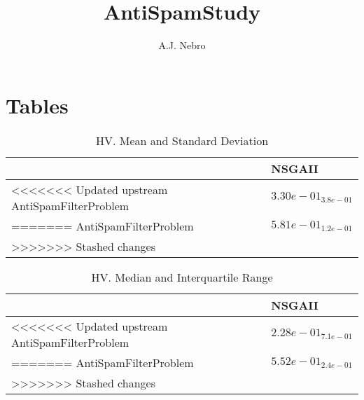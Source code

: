\documentclass{article}
\title{AntiSpamStudy}
\author{A.J. Nebro}
\begin{document}
\maketitle
\section{Tables}

\begin{table}
\caption{HV. Mean and Standard Deviation}
\label{table: HV}
\centering
\begin{scriptsize}
\begin{tabular}{ll}
\hline &  NSGAII\\
\hline 
<<<<<<< Updated upstream
AntiSpamFilterProblem & \cellcolor{gray95}$  3.30e-01_{ 3.8e-01}$ \\
=======
AntiSpamFilterProblem & \cellcolor{gray95}$  5.81e-01_{ 1.2e-01}$ \\
>>>>>>> Stashed changes
\hline
\end{tabular}
\end{scriptsize}
\end{table}

\begin{table}
\caption{HV. Median and Interquartile Range}
\label{table: HV}
\centering
\begin{scriptsize}
\begin{tabular}{ll}
\hline &  NSGAII\\
\hline 
<<<<<<< Updated upstream
AntiSpamFilterProblem & \cellcolor{gray95}$  2.28e-01_{ 7.1e-01}$ \\
=======
AntiSpamFilterProblem & \cellcolor{gray95}$  5.52e-01_{ 2.4e-01}$ \\
>>>>>>> Stashed changes
\hline
\end{tabular}
\end{scriptsize}
\end{table}
\end{document}
